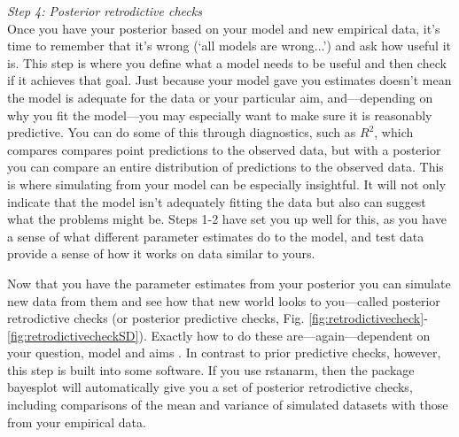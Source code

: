 \documentclass[11pt]{article}
\begin{document}
{\emph{Step 4: Posterior retrodictive checks} \\
Once you have your posterior based on your model and new empirical data, it's time to remember that it's wrong (`all models are wrong...') and ask how useful it is. This step is where you define what a model needs to be useful and then check if it achieves that goal. Just because your model gave you estimates doesn't mean the model is adequate for the data or your particular aim, and---depending on why you fit the model---you may especially want to make sure it is reasonably predictive. You can do some of this through diagnostics, such as $R^2$, which compares compares point predictions to the observed  data, but with a posterior you can compare an entire distribution of predictions to the observed data. This is where simulating from your model can be especially insightful. It will not only indicate that the model isn't adequately fitting the data but also can suggest what the problems might be. Steps 1-2 have set you up well for this, as you have a sense of what different parameter estimates do to the model, and test data provide a sense of how it works on data similar to yours.

Now that you have the parameter estimates from your posterior you can simulate new data from them and see how that new world looks to you---called posterior retrodictive checks (or posterior predictive checks, Fig. \ref{fig:retrodictivecheck}-\ref{fig:retrodictivecheckSD}). Exactly how to do these are---again---dependent on your question, model and aims \citep[but there is lots written on this,][]{held2010,gelman200ppc,conn2018}. In contrast to prior predictive checks, however, this step is built into some software. If you use \textsf{rstanarm}, then the package \textsf{bayesplot} will automatically give you a set of posterior retrodictive checks, including comparisons of the mean and variance of simulated datasets with those from your empirical data. 

}
\end{document}
